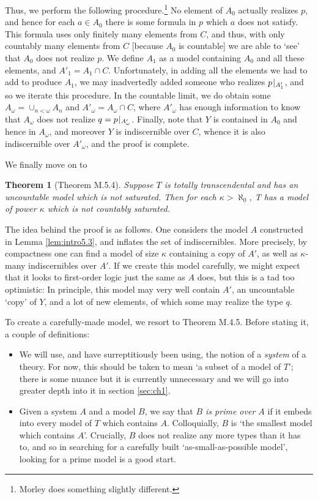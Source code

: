\documentclass{article}
\newtheorem{theorem}{Theorem}[section]
\theoremstyle{nonumberplain}
\newcommand{\rst}[2]{#1\mspace{1.3mu plus 0.5mu minus 0.5mu}|_{#2}}
\begin{document}
Thus, we perform the following procedure.\footnote{Morley does something slightly different.} No element of $A_0$ actually realizes $p$, and hence for each $a \in A_0$ there is some formula in $p$ which $a$ does not satisfy. This formula uses only finitely many elements from $C$, and thus, with only countably many elements from $C$ [because $A_0$ is countable] we are able to `see' that $A_0$ does not realize $p$. We define $A_1$ as a model containing $A_0$ and all these elements, and $A'_1 = A_1 \cap C$. Unfortunately, in adding all the elements we had to add to produce $A_1$, we may inadvertedly added someone who realizes $\rst p{A'_1}$, and so we iterate this procedure. In the countable limit, we do obtain some $A_\omega = \cup_{n < \omega} A_n$ and $A'_\omega = A_\omega \cap C$, where $A'_\omega$ has enough information to know that $A_\omega$ does not realize $q = \rst p{A'_\omega}$. Finally, note that $Y$ is contained in $A_0$ and hence in $A_\omega$, and moreover $Y$ is indiscernible over $C$, whence it is also indiscernible over $A'_\omega$, and the proof is complete.

We finally move on to
\begin{theorem}[Theorem M.5.4]\label{thm:intro5.4}
Suppose $T$ is totally transcendental and has an uncountable model which is not saturated. Then for each $\kappa > \aleph_0$, T has a model of power $\kappa$ which is not countably saturated.
\end{theorem}

The idea behind the proof is as follows. One considers the model $A$ constructed in Lemma \ref{lem:intro5.3}, and inflates the set of indiscernibles. More precisely, by compactness one can find a model of size $\kappa$ containing a copy of $A'$, as well as $\kappa$-many indiscernibles over $A'$. If we create this model carefully, we might expect that it looks to first-order logic just the same as $A$ does, but this is a tad too optimistic: In principle, this model may very well contain $A'$, an uncountable `copy' of $Y$, and a lot of new elements, of which some may realize the type $q$.

To create a carefully-made model, we resort to Theorem M.4.5. Before stating it, a couple of definitions:
\begin{itemize}
\item We will use, and have surreptitiously been using, the notion of a \emph{system} of a theory. For now, this should be taken to mean `a subset of a model of $T$'; there is some nuance but it is currently unnecessary and we will go into greater depth into it in section \ref{sec:ch1}.
\item Given a system $A$ and a model $B$, we say that \emph{$B$ is prime over $A$} if it embeds into every model of $T$ which contains $A$. Colloquially, $B$ is `the smallest model which contains $A$'. Crucially, $B$ does not realize any more types than it has to, and so in searching for a carefully built `as-small-as-possible model', looking for a prime model is a good start.
\end{itemize}
\end{document}
